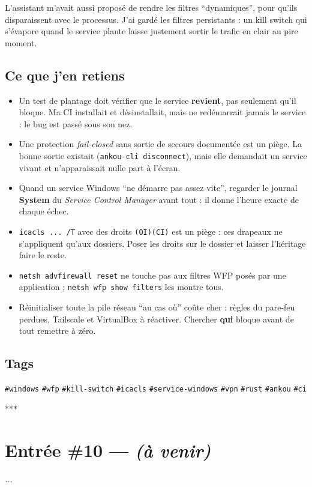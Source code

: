 \documentclass[10pt,twoside,openany]{article}
\newcommand{\entryrule}{\par\vspace{1.2em}\begin{center}\color{accentblue}$\ast$\quad$\ast$\quad$\ast$\end{center}\par}
\newcommand{\tag}[1]{\texttt{\footnotesize\color{tagolive}\#{#1}}}
\begin{document}
L'assistant m'avait aussi proposé de rendre les filtres \enquote{dynamiques}, pour qu'ils disparaissent avec le processus. J'ai gardé les filtres persistants : un kill switch qui s'évapore quand le service plante laisse justement sortir le trafic en clair au pire moment.

\subsection*{Ce que j'en retiens}
\begin{itemize}
  \item Un test de plantage doit vérifier que le service \textbf{revient}, pas seulement qu'il bloque. Ma CI installait et désinstallait, mais ne redémarrait jamais le service : le bug est passé sous son nez.
  \item Une protection \textit{fail-closed} sans sortie de secours documentée est un piège. La bonne sortie existait (\texttt{ankou-cli disconnect}), mais elle demandait un service vivant et n'apparaissait nulle part à l'écran.
  \item Quand un service Windows \enquote{ne démarre pas assez vite}, regarder le journal \textbf{System} du \textit{Service Control Manager} avant tout : il donne l'heure exacte de chaque échec.
  \item \texttt{icacls ... /T} avec des droits \texttt{(OI)(CI)} est un piège : ces drapeaux ne s'appliquent qu'aux dossiers. Poser les droits sur le dossier et laisser l'héritage faire le reste.
  \item \texttt{netsh advfirewall reset} ne touche pas aux filtres WFP posés par une application ; \texttt{netsh wfp show filters} les montre tous.
  \item Réinitialiser toute la pile réseau \enquote{au cas où} coûte cher : règles du pare-feu perdues, Tailscale et VirtualBox à réactiver. Chercher \textbf{qui} bloque avant de tout remettre à zéro.
\end{itemize}

\subsection*{Tags}
\tag{windows} \quad \tag{wfp} \quad \tag{kill-switch} \quad \tag{icacls} \quad \tag{service-windows} \quad \tag{vpn} \quad \tag{rust} \quad \tag{ankou} \quad \tag{ci}

\entryrule


\section{Entrée \#10 --- \textit{(à venir)}}

\textit{...}
\end{document}
